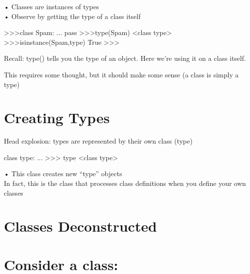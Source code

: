 \documentclass[
  letterpaper,
  DIV=11,
  numbers=noendperiod]{scrreprt}
\newenvironment{Shaded}{\begin{snugshade}}{\end{snugshade}}
\newcommand{\NormalTok}[1]{\textcolor[rgb]{0.00,0.23,0.31}{#1}}
\begin{document}
• Classes are instances of types\\
• Observe by getting the type of a class itself

\begin{Shaded}
\begin{Highlighting}[]
\NormalTok{\textgreater{}\textgreater{}\textgreater{}class Spam:   }
\NormalTok{... pass   }
\NormalTok{\textgreater{}\textgreater{}\textgreater{}type(Spam)   }
\NormalTok{\textless{}class \textquotesingle{}type\textquotesingle{}\textgreater{}   }
\NormalTok{\textgreater{}\textgreater{}\textgreater{}isinstance(Spam,type)   }
\NormalTok{True   }
\NormalTok{\textgreater{}\textgreater{}\textgreater{} }
\end{Highlighting}
\end{Shaded}

Recall: type() tells you the type of an object. Here we're using it on a
class itself.

This requires some thought, but it should make some sense (a class is
simply a type)


\chapter{Creating Types}\label{creating-types}

Head explosion: types are represented by their own class (type)

\begin{Shaded}
\begin{Highlighting}[]
\NormalTok{class type:}
\NormalTok{    ...}
\NormalTok{\textgreater{}\textgreater{}\textgreater{} type}
\NormalTok{\textless{}class \textquotesingle{}type\textquotesingle{}\textgreater{} }
\end{Highlighting}
\end{Shaded}

• This class creates new ``type'' objects\\
In fact, this is the class that processes class definitions when you
define your own classes


\chapter{Classes Deconstructed}\label{classes-deconstructed}


\chapter{Consider a class:}\label{consider-a-class}
\end{document}
